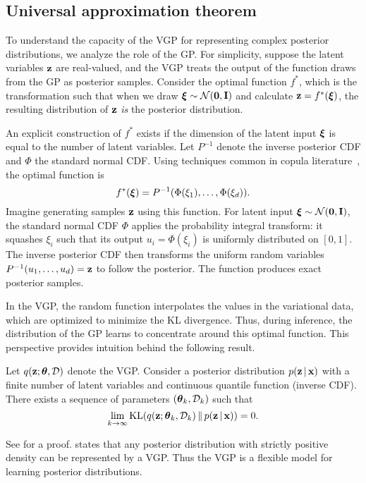 \subsection{Universal approximation theorem}
\label{sec:vgp:universal}



To understand the capacity of the \gls{VGP} for representing complex
posterior distributions,
we analyze the role of the \acrlong{GP}. For simplicity,
suppose the latent variables $\boldsymbol{\mathbf{z}}$ are real-valued, and the \gls{VGP}
treats the output of the function draws from the \gls{GP} as posterior
samples.
Consider the optimal
function $f^*$, which is the transformation such that when we draw
$\boldsymbol{\mathbf{\xi}}\sim\mathcal{N}(\boldsymbol{\mathbf{0}},\boldsymbol{\mathbf{I}})$ and calculate $\boldsymbol{\mathbf{z}}= f^*(\boldsymbol{\mathbf{\xi}})$,
the resulting distribution of $\boldsymbol{\mathbf{z}}$ \emph{is} the posterior distribution.

An explicit construction of $f^*$ exists if the dimension of the
latent input $\boldsymbol{\mathbf{\xi}}$ is equal to the number of latent variables. Let
$P^{-1}$ denote the inverse posterior CDF and $\Phi$ the standard
normal CDF. Using techniques common in copula
literature~\citep{nelsen2006introduction}, the optimal function is
\begin{equation*}
f^*(\boldsymbol{\mathbf{\xi}}) = P^{-1}(\Phi(\xi_1),\ldots,\Phi(\xi_d)).
\end{equation*}
Imagine generating samples $\boldsymbol{\mathbf{z}}$ using this function. For latent
input $\boldsymbol{\mathbf{\xi}}\sim\mathcal{N}(\boldsymbol{\mathbf{0}},\boldsymbol{\mathbf{I}})$, the standard normal CDF
$\Phi$ applies the probability integral transform: it squashes
$\xi_i$ such that its output $u_i=\Phi(\xi_i)$ is uniformly
distributed on $[0,1]$. The inverse posterior CDF then transforms the
uniform random variables $P^{-1}(u_1,\ldots,u_d)=\boldsymbol{\mathbf{z}}$ to follow
the posterior. The function produces exact posterior samples.

In the \gls{VGP}, the random function interpolates the values in the variational data,
which are optimized to minimize the KL divergence.
Thus, during inference, the distribution of the \gls{GP} learns to concentrate around this
optimal function. This perspective provides intuition
behind the following result.


\newcommand{\limittheorem}{
Let $q(\mbz;\mbtheta, \cD)$ denote the \acrlong{VGP}. Consider a
posterior distribution $p(\mbz\g\mbx)$ with a finite number of latent
variables and continuous quantile function (inverse CDF). There exists
a sequence of parameters
$(\mbtheta_k, \cD_k)$ such that
\begin{equation*}
\lim_{k \to \infty} \operatorname{KL}(q(\mbz; \mbtheta_k, \cD_k) \gg p(\mbz\g\mbx))
= 0
.
\end{equation*}
}
\begin{theorem}
\label{theorem:limit}
\limittheorem
\end{theorem}
See  for a proof.  states that any
posterior distribution with strictly positive density
can be represented by a \gls{VGP}.
Thus the \gls{VGP} is a
flexible model for learning posterior distributions.





